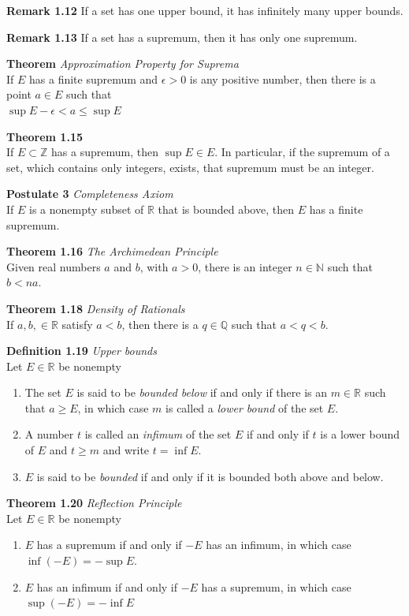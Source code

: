 \documentclass[8pt,landscape]{article}
\begin{document}
\begin{multicols}{3}
    \textbf{Remark 1.12}
    If a set has one upper bound, it has infinitely many upper bounds.

    \textbf{Remark 1.13}
    If a set has a supremum, then it has only one supremum.

    \textbf{Theorem} \emph{Approximation Property for Suprema} \\
    If $E$ has a finite supremum and $\epsilon > 0$ is any positive number, then there is a
    point $a \in E$ such that \\
    $\sup E - \epsilon < a \leq \sup E$

    \textbf{Theorem 1.15} \\
    If $E \subset \mathbb{Z}$ has a supremum, then $\sup E \in E$.
    In particular, if the supremum of a set, which contains only integers, exists,
    that supremum must be an integer.

    \textbf{Postulate 3} \emph{Completeness Axiom} \\
    If $E$ is a nonempty subset of $\mathbb{R}$ that is bounded above, then $E$ has a
    finite
    supremum.

    \textbf{Theorem 1.16} \emph{The Archimedean Principle} \\
    Given real numbers $a$ and $b$, with $a > 0$, there is an integer $n \in \mathbb{N}$
    such that $b < na$.

    \textbf{Theorem 1.18} \emph{Density of Rationals} \\
    If $a, b, \in \mathbb{R}$ satisfy $a < b$, then there is a $q \in \mathbb{Q}$
    such that $a < q < b$.

    \textbf{Definition 1.19} \emph{Upper bounds} \\
    Let $E \in \mathbb{R}$ be nonempty
    \begin{enumerate}
        \item The set $E$ is said to be \emph{bounded below} if and only if there is an
            $m \in \mathbb{R}$ such that $a \geq E$, in which case $m$ is called a
            \emph{lower bound} of the set $E$.
        \item A number $t$ is called an \emph{infimum} of the set $E$ if and only if $t$
            is a lower bound of $E$ and $t \geq m$ and write $t = \inf E$.
        \item $E$ is said to be \emph{bounded} if and only if it is bounded both above and
            below.
    \end{enumerate}

    \textbf{Theorem 1.20} \emph{Reflection Principle} \\
    Let $E \in \mathbb{R}$ be nonempty
    \begin{enumerate}
        \item $E$ has a supremum if and only if $-E$ has an infimum, in which case
            $\inf (-E) = -\sup E$.
        \item $E$ has an infimum if and only if $-E$ has a supremum, in which case
            $\sup (-E) = -\inf E$
    \end{enumerate}


\end{multicols}
\end{document}
